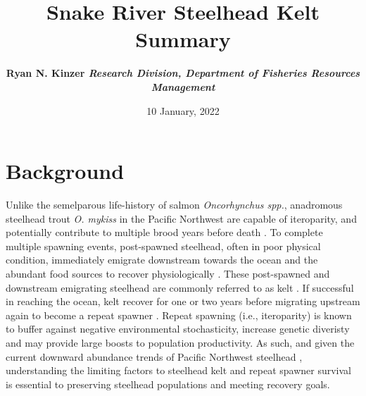 \documentclass[11pt,a4paper,]{article}
\title{Snake River Steelhead Kelt Summary \vspace{0.5cm}}
\author{\Large \bf{Ryan N. Kinzer}\vspace{0.05in} \newline\normalsize\emph{Research Division, Department of Fisheries Resources Management}  }
\date{10 January, 2022}
\begin{document}
  \vspace*{0cm}
  \begin{snugshade}%
  \maketitle
  \end{snugshade}\vspace*{0.5cm}

\hbox{\vrule height .2pt width 16cm}




\hypertarget{background}{%
\section{Background}\label{background}}

Unlike the semelparous life-history of salmon \emph{Oncorhynchus spp.}, anadromous steelhead trout \emph{O. mykiss} in the Pacific Northwest are capable of iteroparity, and potentially contribute to multiple brood years before death \autocite{quinnBehaviorEcologyPacific2018}. To complete multiple spawning events, post-spawned steelhead, often in poor physical condition, immediately emigrate downstream towards the ocean and the abundant food sources to recover physiologically \autocite{penneyProximateCompositionEnergy2014}. These post-spawned and downstream emigrating steelhead are commonly referred to as kelt \autocite{quinnBehaviorEcologyPacific2018}. If successful in reaching the ocean, kelt recover for one or two years before migrating upstream again to become a repeat spawner \autocite{need_citation}. Repeat spawning (i.e., iteroparity) is known to buffer against negative environmental stochasticity, increase genetic diveristy and may provide large boosts to population productivity. As such, and given the current downward abundance trends of Pacific Northwest steelhead \autocite{need_citation}, understanding the limiting factors to steelhead kelt and repeat spawner survival is essential to preserving steelhead populations and meeting recovery goals.
\end{document}

